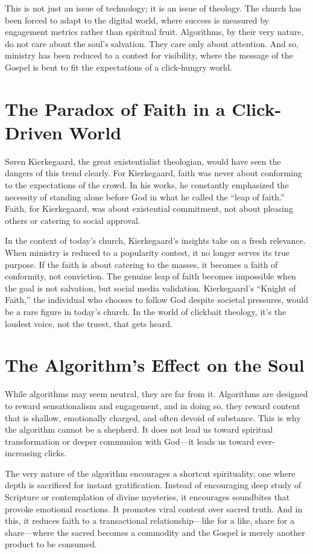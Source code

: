 \documentclass[a4paper,11pt]{book}
\begin{document}
This is not just an issue of technology; it is an issue of theology. The church has been forced to adapt to the digital world, where success is measured by engagement metrics rather than spiritual fruit. Algorithms, by their very nature, do not care about the soul’s salvation. They care only about attention. And so, ministry has been reduced to a contest for visibility, where the message of the Gospel is bent to fit the expectations of a click-hungry world.

\section{The Paradox of Faith in a Click-Driven World}

Søren Kierkegaard, the great existentialist theologian, would have seen the dangers of this trend clearly. For Kierkegaard, faith was never about conforming to the expectations of the crowd. In his works, he constantly emphasized the necessity of standing alone before God in what he called the “leap of faith.” Faith, for Kierkegaard, was about existential commitment, not about pleasing others or catering to social approval.

In the context of today’s church, Kierkegaard’s insights take on a fresh relevance. When ministry is reduced to a popularity contest, it no longer serves its true purpose. If the faith is about catering to the masses, it becomes a faith of conformity, not conviction. The genuine leap of faith becomes impossible when the goal is not salvation, but social media validation. Kierkegaard’s “Knight of Faith,” the individual who chooses to follow God despite societal pressures, would be a rare figure in today’s church. In the world of clickbait theology, it’s the loudest voice, not the truest, that gets heard.

\section{The Algorithm’s Effect on the Soul}

While algorithms may seem neutral, they are far from it. Algorithms are designed to reward sensationalism and engagement, and in doing so, they reward content that is shallow, emotionally charged, and often devoid of substance. This is why the algorithm cannot be a shepherd. It does not lead us toward spiritual transformation or deeper communion with God—it leads us toward ever-increasing clicks.

The very nature of the algorithm encourages a shortcut spirituality, one where depth is sacrificed for instant gratification. Instead of encouraging deep study of Scripture or contemplation of divine mysteries, it encourages soundbites that provoke emotional reactions. It promotes viral content over sacred truth. And in this, it reduces faith to a transactional relationship—like for a like, share for a share—where the sacred becomes a commodity and the Gospel is merely another product to be consumed.
\end{document}
